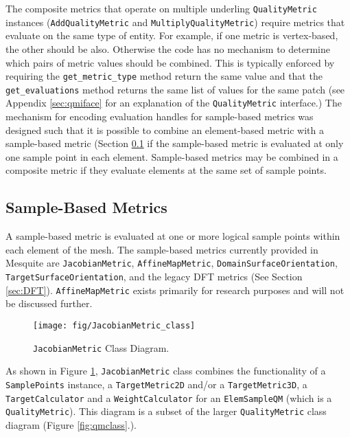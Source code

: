 \documentclass{article}
\begin{document}
The composite metrics that operate on multiple underling \texttt{QualityMetric} instances (\texttt{AddQualityMetric} and \texttt{MultiplyQualityMetric}) require metrics that evaluate on the same type of entity.  For example, if one metric is vertex-based, the other should be also.  Otherwise the code has no mechanism to determine which pairs of metric values should be combined.  This is typically enforced by requiring the \texttt{get\_metric\_type} method return the same value and that the \texttt{get\_evaluations} method returns the same list of values for the same patch (see Appendix \ref{sec:qmiface} for an explanation of the \texttt{QualityMetric} interface.)   The mechanism for encoding evaluation handles for sample-based metrics was designed such that it is possible to combine an element-based metric with a sample-based metric (Section \ref{sec:sample-metrics} if the sample-based metric is evaluated at only one sample point in each element.  Sample-based metrics may be combined in a composite metric if they evaluate elements at the same set of sample points.

\subsection{Sample-Based Metrics}
\label{sec:sample-metrics}
A sample-based metric is evaluated at one or more logical sample points within each element of the mesh. The sample-based metrics currently provided in Mesquite are \texttt{JacobianMetric}, \texttt{AffineMapMetric}, \texttt{DomainSurfaceOrientation}, \texttt{TargetSurfaceOrientation}, and the legacy DFT metrics (See Section \ref{sec:DFT}). \texttt{AffineMapMetric} exists primarily for research purposes and will not be discussed further.

\begin{figure}[htb]
\begin{center}
\texttt{[image: fig/JacobianMetric\_class]}
\caption{\texttt{JacobianMetric} Class Diagram.\label{fig:JacobianMetric}}
\end{center}
\end{figure}

As shown in Figure \ref{fig:JacobianMetric}, \texttt{JacobianMetric} class combines the functionality of a \texttt{SamplePoints} instance, a \texttt{TargetMetric2D} and/or a \texttt{TargetMetric3D}, a \texttt{TargetCalculator} and a \texttt{WeightCalculator} for an \texttt{ElemSampleQM} (which is a \texttt{QualityMetric}).  This diagram is a subset of the larger \texttt{QualityMetric} class diagram (Figure \ref{fig:qmclass}.).
\end{document}
